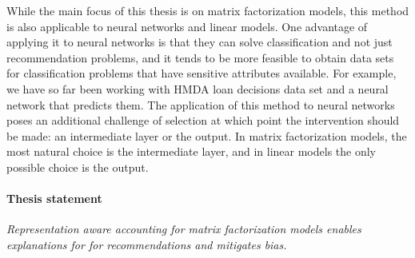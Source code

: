 While the main focus of this thesis is on matrix factorization models, this
method is also applicable to neural networks and linear models. One advantage of
applying it to neural networks is that they can solve classification and not
just recommendation problems, and it tends to be more feasible to obtain data
sets for classification problems that have sensitive attributes available. For
example, we have so far been working with HMDA loan decisions data set and a
neural network that predicts them. The application of this method to neural
networks poses an additional challenge of selection at which point the
intervention should be made: an intermediate layer or the output. In matrix
factorization models, the most natural choice is the intermediate layer, and in
linear models the only possible choice is the output.

\paragraph{Thesis statement}

\emph{Representation aware accounting for matrix factorization models enables
explanations for for recommendations and mitigates bias.}


